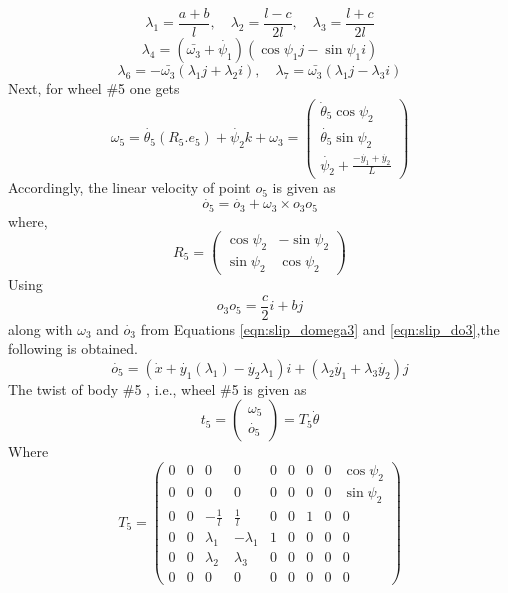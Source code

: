 { \[\lambda_1=\frac{a+b}{l}, \quad \lambda_2=\frac{l-c}{2l}, \quad \lambda_3=\frac{l+c}{2l} \]
  \[\lambda_4=(\bar{\omega_3}+\dot{\psi_1}) (\cos\psi_1 j-\sin \psi_1 i) \]
  \[\lambda_6=-\bar{\omega_3}(\lambda_1 j+\lambda_2 i), \quad \lambda_7=\bar{\omega_3}(\lambda_1 j-\lambda_3 i)\]
Next, for wheel \#5  one gets 
\[\omega_5 = \dot{\theta_5} (R_5.e_5) + \dot{\psi_2} k + \omega_3 =
  \left(
\begin{array}{c}
\dot{\theta }_5 \cos \psi_2 \\
\dot{\theta_5} \sin \psi_2 \\
\dot{\psi_2}+\frac{-\dot{y_1}+\dot{y_2}}{L}
\end{array}
\right) \]
Accordingly, the linear velocity of point $o_5$ is given as 
\[ \dot{o_5}=\dot{o_3}+\omega_3 \times o_3o_5\]
where, \begin{equation}
\label{eqn:slipR5}
R_5=\begin{pmatrix}
\cos \psi_2 & - \sin \psi_2\\
\sin \psi_2 & \cos\psi_2
\end{pmatrix}
\end{equation}
Using  \[ o_3o_5=\frac{c}{2}i+bj\] along with $\omega_3$ and $\dot{o_3}$ from Equations \ref{eqn:slip_domega3} and  \ref{eqn:slip_do3},the following is obtained.
\[\dot{o_5}= \left( \dot{x}+\dot{y_1}(\lambda_1)-\dot{y_2}\lambda_1 \right)i +\left( \lambda_2\dot{y_1}+\lambda_3\dot{y_2}\right)j  \]
The twist of body \#5 , i.e., wheel \#5 is given as 
\begin{equation}
\label{eqn:slip_t5}
t_5=
\begin{pmatrix}
\omega_5\\
\dot{o_5}
\end{pmatrix}=T_5 \dot{\theta}
\end{equation}
Where
\begin{equation}
\label{eqn:slip_T5}
T_5=\left(
\begin{array}{ccccccccc}
0 & 0 & 0 & 0 & 0 & 0 & 0 & 0 & \cos \psi_2\\
0 & 0 & 0 & 0 & 0 & 0 & 0 & 0 & \sin\psi_2 \\
0 & 0 & -\frac{1}{l} & \frac{1}{l} & 0 & 0 & 1 & 0 & 0 \\
0 & 0 & \lambda_1 & -\lambda_1 & 1 & 0 & 0 & 0 & 0 \\
0 & 0 &\lambda_2& \lambda_3 & 0 & 0 & 0 & 0 & 0 \\
0 & 0 & 0 & 0 & 0 & 0 & 0 & 0 & 0
\end{array}
\right)
\end{equation}

}
